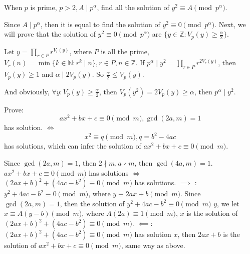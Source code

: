 \documentclass{ctexart}
\newif\ifpreface
\begin{document}
\large
\setlength{\baselineskip}{1.2em}
\ifpreface

\else
{}

\begin{problem}\label{pro:1}
  When \(p\) is prime, \(p > 2, A \mid p^\alpha\), find all the solution of \(y^2 \equiv A \pmod{p^\alpha}\).
\end{problem}
\begin{solution}
  Since \(A \mid p^{\alpha}\), then it is equal to find the solution of \(y^2 \equiv 0 \pmod{p^\alpha}\).
  Next, we will prove that the solution of \(y^2 \equiv 0 \pmod{p^\alpha}\) are \(\{y \in \mathbb{Z}: V_p(y) \geq \frac{\alpha }{2}\}\).

  Let \(y = \prod_{r \in P}r^{V_r(y)}\), where \(P\) is all the prime, \(V_r(n)=\min \{k \in \mathbb{N}:r^k \mid n \},r \in P, n \in \mathbb{Z}\).
  If \(p^\alpha \mid y^2 = \prod_{r \in P}r^{2V_r(y)}\), then \(V_p(y) \geq 1\) and \(\alpha \mid 2 V_p(y)\).
  So \(\frac{\alpha }{2}\leq V_p(y)\).

  And obviously, \(\forall y:V_p(y) \geq \frac{\alpha }{2}\), then \(V_p(y^2) =2V_p(y) \geq \alpha\), then \(p^\alpha \mid y^2\).
\end{solution}

\begin{problem}\label{pro:2}
  Prove:
  \[
    ax^2 + bx + c \equiv 0 \pmod{m},\gcd(2a,m)=1
  \]
  has solution.
  \(\iff\)
  \[
    x^2 \equiv q \pmod{m},q=b^2 -4ac
  \]
  has solutions, which can infer the solution of \(ax^2 + bx + c \equiv 0 \pmod{m}\).
\end{problem}
\begin{solution}
  Since \(\gcd(2a,m)=1\), then \(2 \nmid m, a \nmid m\), then \(\gcd(4a,m)=1\).
  \(ax^2 + bx + c \equiv 0 \pmod{m}\) has solutions \(\iff\) \((2ax + b)^2 + (4ac -b^2) \equiv 0 \pmod{m}\) has solutions.
  \(\implies\) :\(y^2 + 4ac-b^2 \equiv 0 \pmod{m}\), where \(y \equiv 2ax + b \pmod{m}\).
  Since \(\gcd(2a,m)=1\), then the solution of \(y^2 + 4ac-b^2 \equiv 0 \pmod{m}\) \(y\), we
  let \(x \equiv A(y-b) \pmod{m}\), where \(A(2a) \equiv 1 \pmod{m}\),
  \(x\) is the solution of \((2ax + b)^2 + (4ac -b^2) \equiv 0 \pmod{m}\).
  \(\impliedby\): \((2ax + b)^2 + (4ac -b^2) \equiv 0 \pmod{m}\) has solution \(x\), then \(2ax + b\) is the solution of \(ax^2 + bx + c \equiv 0 \pmod{m}\), same
  way as above.
\end{solution}
\end{document}
